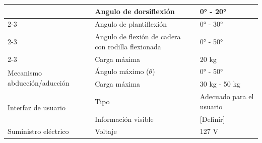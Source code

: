 \begin{table}[h!]
{\begin{tabular}{|m{5.5cm}|m{5.5cm}|m{4.5cm}|}
			& Angulo   de dorsiflexión                             & 0° -  20°                                                \\ \cline{2-3} 
			& Angulo   de plantiflexión                            & 0° -  30°                                                \\ \cline{2-3} 
			& Angulo   de flexión de cadera con rodilla flexionada & 0° - 50°                                                 \\ \cline{2-3} 
			& Carga   máxima                                       & 20 kg                                                    \\ \hline
			\multirow{2}{*}{Mecanismo abducción/aducción} & Ángulo máximo ($\theta$)                                    & 0° - 50°                                                 \\ \cline{2-3} 
			& Carga   máxima                                       & 30 kg - 50 kg                                            \\ \hline
			\multirow{2}{*}{Interfaz de usuario}                         & Tipo                                                 & Adecuado para el usuario                                 \\ \cline{2-3} 
			& Información   visible                                & {[}Definir{]}                                            \\ \hline
			Suministro eléctrico                                         & Voltaje                                              & 127 V                                                                                       \\ \hline
	\end{tabular}}
\end{table}

